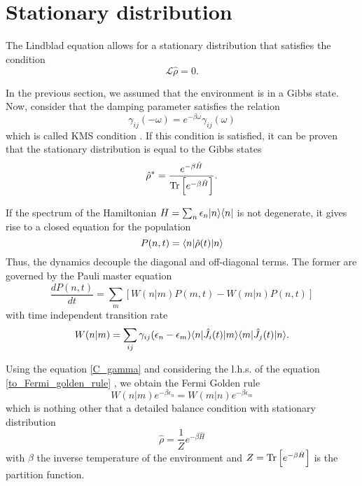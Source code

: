 

\section{Stationary distribution}
The Lindblad equation allows for a stationary distribution that satisfies the condition
\begin{equation}
    \mathcal{L}\hat\rho = 0.
\end{equation}

In the previous section, we assumed that the environment is in a Gibbs state. Now, consider that the damping parameter satisfies the relation
\begin{equation}\label{C_gamma}
    \gamma_{ij}(-\omega) = e^{-\beta \omega}\gamma_{ij}(\omega)
\end{equation}
which is called KMS condition \cite{Breuer-Petruccione}.
If this condition is satisfied, it can be proven that the stationary distribution is equal to the Gibbs states \cite{Breuer-Petruccione}
\begin{equation}
    \hat\rho^* = \frac{e^{-\beta \hat H}}{\operatorname{Tr}\left[e^{-\beta \hat H}\right]}.
\end{equation}

If the spectrum of the Hamiltonian $H = \sum_n \epsilon_n\lvert n\rangle\langle n\rvert$ is not degenerate, it gives rise to a closed equation for the population 
\begin{equation}
    P(n,t) = \langle n\rvert\hat\rho(t)\lvert n\rangle
\end{equation}
Thus, the dynamics decouple the diagonal and off-diagonal terms. The former are governed by the Pauli master equation
\begin{equation}\label{to_Fermi_golden_rule}
    \frac{dP(n,t)}{dt} = \sum_m \left[ W(n|m)P(m,t) - W(m|n)P(n,t)\right]
\end{equation}
with time independent transition rate
\begin{equation}
    W(n|m) = \sum_{ij} \gamma_{ij}(\epsilon_n -\epsilon_m)\langle n\rvert\hat J_i(t)\lvert m\rangle \langle m\rvert\hat J_j(t)\lvert n\rangle. 
\end{equation}

Using the equation \eqref{C_gamma} and considering the l.h.s. of the equation \eqref{to_Fermi_golden_rule} , we obtain the Fermi Golden rule
\begin{equation}
    W(n|m)e^{-\beta \epsilon_n} = W(m|n) e^{-\beta \epsilon_m}
\end{equation}
which is nothing other that a detailed balance condition with stationary distribution
\begin{equation}
    \hat\rho = \frac{1}{Z}e^{-\beta \hat H}
\end{equation}
with $\beta$ the inverse temperature of the environment and $Z = \operatorname{Tr}\left[e^{-\beta \hat H}\right]$ is the partition function.



%